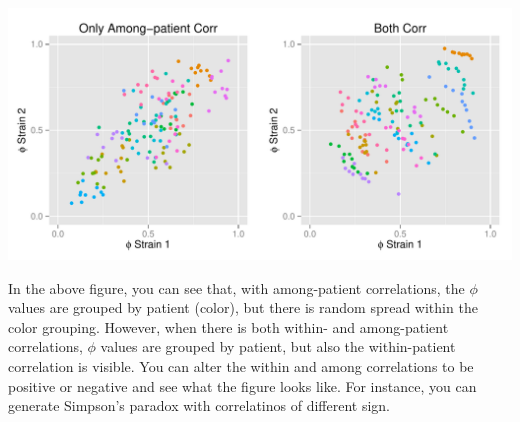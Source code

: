 \documentclass{article}
\begin{document}
\begin{center}
\includegraphics{ReadMe-008}
\end{center}

In the above figure, you can see that, with among-patient correlations, the $\phi$ values are grouped by patient (color), but there is random spread within the color grouping. However, when there is both within- and among-patient correlations, $\phi$ values are grouped by patient, but also the within-patient correlation is visible. You can alter the within and among correlations to be positive or negative and see what the figure looks like. For instance, you can generate Simpson's paradox with correlatinos of different sign. 
\end{document}

